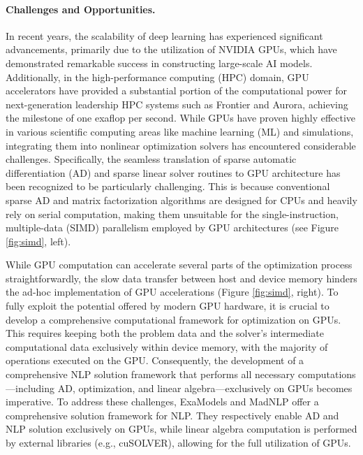 \paragraph{Challenges and Opportunities.} In recent years, the
scalability of deep learning has experienced significant advancements,
primarily due to the utilization of NVIDIA
GPUs, which have demonstrated remarkable success in constructing
large-scale AI models. Additionally, in the high-performance computing (HPC) domain, GPU
accelerators have provided a substantial portion of the computational
power for next-generation leadership HPC systems such as Frontier and
Aurora, achieving the milestone of one exaflop per second.  While GPUs
have proven highly effective in various scientific computing areas
like machine learning (ML) and simulations, integrating them
into nonlinear optimization solvers has encountered
considerable challenges. Specifically, the seamless translation of
sparse automatic differentiation (AD) and sparse linear solver
routines to GPU architecture has been recognized to be particularly
challenging.  This is because conventional sparse AD and matrix
factorization algorithms are designed for CPUs and heavily rely on
serial computation, making them unsuitable for the single-instruction,
multiple-data (SIMD) parallelism employed by GPU architectures (see
Figure \ref{fig:simd}, left).

While GPU computation can accelerate several parts of the optimization
process straightforwardly, the slow data transfer between host and
device memory hinders the ad-hoc implementation of GPU accelerations
(Figure \ref{fig:simd}, right). To fully exploit the potential offered
by modern GPU hardware, it is crucial to develop a comprehensive
computational framework for optimization on GPUs. This requires
keeping both the problem data and the solver's intermediate computational
data exclusively within device memory, with the majority of
operations executed on the GPU. Consequently, the development of a
comprehensive NLP solution framework that performs
all necessary computations---including AD, optimization, and linear
algebra---exclusively on GPUs becomes imperative.  To address these
challenges, ExaModels and MadNLP offer a comprehensive solution
framework for NLP. They respectively enable AD and NLP solution
exclusively on GPUs, while linear algebra computation is performed by
external libraries (e.g., cuSOLVER), allowing for the full
utilization of GPUs.

